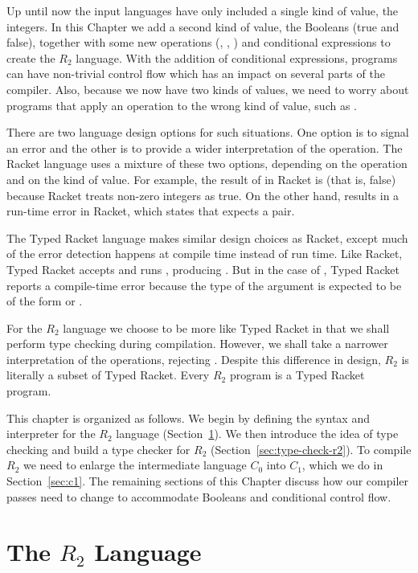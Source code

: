 \documentclass[11pt]{book}
\begin{document}
Up until now the input languages have only included a single kind of
value, the integers. In this Chapter we add a second kind of value,
the Booleans (true and false), together with some new operations
(, , ) and conditional expressions to create
the $R_2$ language.  With the addition of conditional expressions,
programs can have non-trivial control flow which has an impact on
several parts of the compiler. Also, because we now have two kinds of
values, we need to worry about programs that apply an operation to the
wrong kind of value, such as .

There are two language design options for such situations.  One option
is to signal an error and the other is to provide a wider
interpretation of the operation. The Racket language uses a mixture of
these two options, depending on the operation and on the kind of
value. For example, the result of  in Racket is
 (that is, false) because Racket treats non-zero integers as
true. On the other hand,  results in a run-time error in
Racket, which states that  expects a pair.

The Typed Racket language makes similar design choices as Racket,
except much of the error detection happens at compile time instead of
run time. Like Racket, Typed Racket accepts and runs ,
producing . But in the case of , Typed Racket
reports a compile-time error because the type of the argument is
expected to be of the form  or .

For the $R_2$ language we choose to be more like Typed Racket in that
we shall perform type checking during compilation.  However, we shall
take a narrower interpretation of the operations, rejecting
. Despite this difference in design,
$R_2$ is literally a subset of Typed Racket.  Every $R_2$
program is a Typed Racket program.

This chapter is organized as follows.  We begin by defining the syntax
and interpreter for the $R_2$ language (Section~\ref{sec:r2-lang}). We
then introduce the idea of type checking and build a type checker for
$R_2$ (Section~\ref{sec:type-check-r2}). To compile $R_2$ we need to
enlarge the intermediate language $C_0$ into $C_1$, which we do in
Section~\ref{sec:c1}. The remaining sections of this Chapter discuss
how our compiler passes need to change to accommodate Booleans and
conditional control flow.


\section{The $R_2$ Language}
\label{sec:r2-lang}
\end{document}
